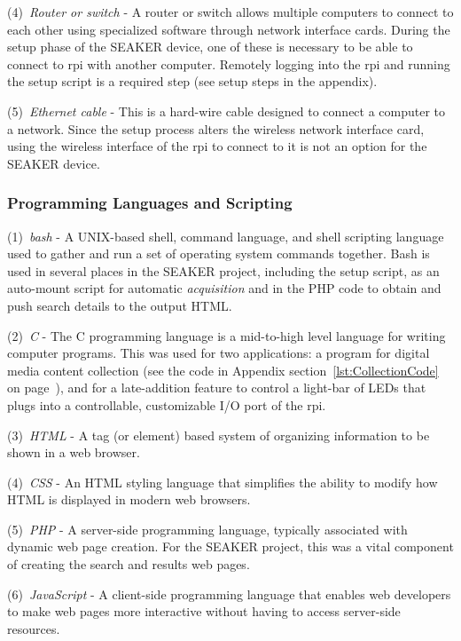 \documentclass[12pt]{article}
\begin{document}
(4)~{\em Router or switch} - A router or switch allows multiple computers
to connect to each other using specialized software through network
interface cards.  During the setup phase of the SEAKER device,
one of these is necessary to be able to connect to \gls{rpi} with
another computer.  Remotely logging into the \gls{rpi} and running the
setup script is a required step (see setup steps in the appendix).

(5)~{\em Ethernet cable} - This is a hard-wire cable designed to connect
a computer to a network.  Since the setup process alters the wireless
network interface card, using the wireless interface of the \gls{rpi} to
connect to it is not an option for the SEAKER device.


\subsubsection{Programming Languages and Scripting}

(1)~{\em bash} - A UNIX-based shell, command language, and shell
scripting language used to gather and run a set of operating system
commands together.  Bash is used in several places in the SEAKER
project, including the setup script, as an auto-mount script
for automatic {\em acquisition} and in the PHP code to obtain and
push search details to the output HTML.

(2)~{\em C} - The C programming language is a mid-to-high level
language for writing computer programs.  This was used for two
applications: a program for digital media content collection 
(see the code in Appendix section~\ref{lst:CollectionCode}
on page~\pageref{lst:CollectionCode}),
and for a late-addition feature to control a light-bar of LEDs that
plugs into a controllable, customizable I/O port of the \gls{rpi}.

(3)~{\em HTML} - A tag (or element) based system of organizing
information to be shown in a web browser.

(4)~{\em CSS} - An HTML styling language that simplifies the
ability to modify how HTML is displayed in modern web browsers.

(5)~{\em PHP} - A server-side programming language, typically
associated with dynamic web page creation.  For the SEAKER
project, this was a vital component of creating the search and
results web pages.

(6)~{\em JavaScript} - A client-side programming language that 
enables web developers to make web pages more interactive without
having to access server-side resources.
\end{document}
